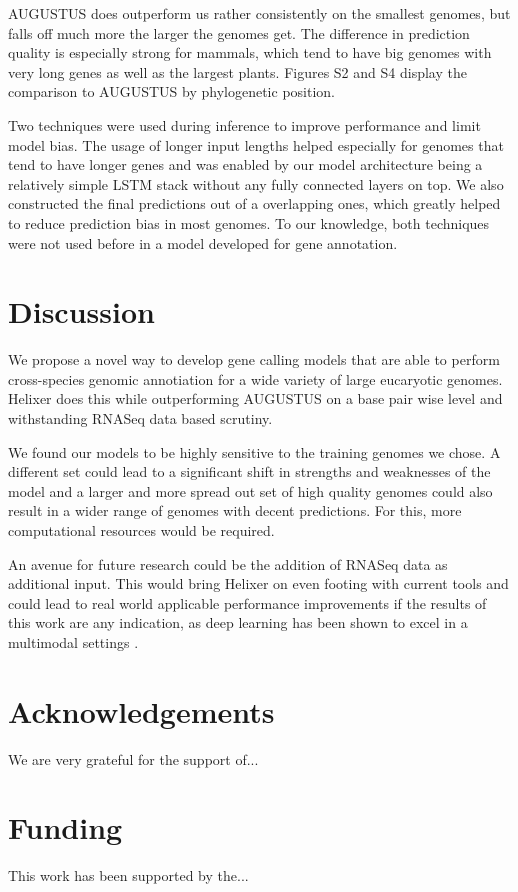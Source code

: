 \documentclass{bioinfo}
\begin{document}
AUGUSTUS does outperform us rather consistently on the smallest genomes, but falls off much more the larger the genomes get. The difference in prediction quality is especially strong for mammals, which tend to have big genomes with very long genes as well as the largest plants. Figures S2 and S4 display the comparison to AUGUSTUS by phylogenetic position.

Two techniques were used during inference to improve performance and limit model bias. The usage of longer input lengths helped especially for genomes that tend to have longer genes and was enabled by our model architecture being a relatively simple LSTM stack without any fully connected layers on top. We also constructed the final predictions out of a overlapping ones, which greatly helped to reduce prediction bias in most genomes. To our knowledge, both techniques were not used before in a model developed for gene annotation. 

\section{Discussion}
We propose a novel way to develop gene calling models that are able to perform cross-species genomic annotiation for a wide variety of large eucaryotic genomes. Helixer does this while outperforming AUGUSTUS on a base pair wise level and withstanding RNASeq data based scrutiny. 

We found our models to be highly sensitive to the training genomes we chose. A different set could lead to a significant shift in strengths and weaknesses of the model and a larger and more spread out set of high quality genomes could also result in a wider range of genomes with decent predictions. For this, more computational resources would be required. 

An avenue for future research could be the addition of RNASeq data as additional input. This would bring Helixer on even footing with current tools and could lead to real world applicable performance improvements if the results of this work are any indication, as deep learning has been shown to excel in a multimodal settings \citep{ching2018opportunities}.

\section*{Acknowledgements}

We are very grateful for the support of...

\section*{Funding}

This work has been supported by the... \vspace*{-12pt}



\end{document}
